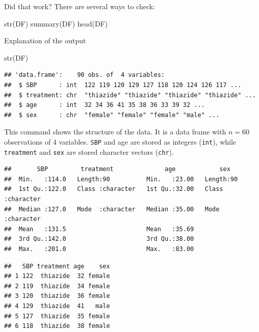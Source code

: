 \documentclass[
]{book}
\newenvironment{Shaded}{\begin{snugshade}}{\end{snugshade}}
\newcommand{\FunctionTok}[1]{\textcolor[rgb]{0.00,0.00,0.00}{#1}}
\newcommand{\NormalTok}[1]{#1}
\begin{document}
Did that work? There are several ways to check:

\begin{Shaded}
\begin{Highlighting}[]
\FunctionTok{str}\NormalTok{(DF)}
\FunctionTok{summary}\NormalTok{(DF)}
\FunctionTok{head}\NormalTok{(DF)}
\end{Highlighting}
\end{Shaded}

Explanation of the output

\begin{Shaded}
\begin{Highlighting}[]
\FunctionTok{str}\NormalTok{(DF)}
\end{Highlighting}
\end{Shaded}

\begin{verbatim}
## 'data.frame':    90 obs. of  4 variables:
##  $ SBP      : int  122 119 120 129 127 118 120 124 126 117 ...
##  $ treatment: chr  "thiazide" "thiazide" "thiazide" "thiazide" ...
##  $ age      : int  32 34 36 41 35 38 36 33 39 32 ...
##  $ sex      : chr  "female" "female" "female" "male" ...
\end{verbatim}

This command shows the structure of the data. It is a data frame with \(n = 60\) observations of 4 variables. \texttt{SBP} and age are stored as integers (\texttt{int}), while \texttt{treatment} and \texttt{sex} are stored character vectors (\texttt{chr}).

\begin{verbatim}
##       SBP         treatment              age            sex           
##  Min.   :114.0   Length:90          Min.   :23.00   Length:90         
##  1st Qu.:122.0   Class :character   1st Qu.:32.00   Class :character  
##  Median :127.0   Mode  :character   Median :35.00   Mode  :character  
##  Mean   :131.5                      Mean   :35.69                     
##  3rd Qu.:142.0                      3rd Qu.:38.00                     
##  Max.   :201.0                      Max.   :83.00
\end{verbatim}

\begin{verbatim}
##   SBP treatment age    sex
## 1 122  thiazide  32 female
## 2 119  thiazide  34 female
## 3 120  thiazide  36 female
## 4 129  thiazide  41   male
## 5 127  thiazide  35 female
## 6 118  thiazide  38 female
\end{verbatim}
\end{document}
